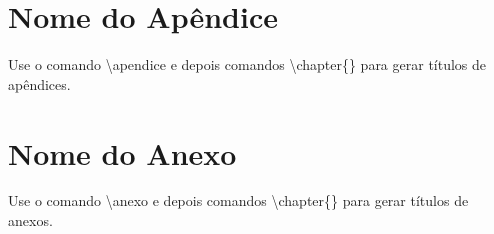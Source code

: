 \documentclass[oneside]{normas-utf-tex} %
\begin{document}
\apendice
\chapter{Nome do Apêndice}

Use o comando {\ttfamily \textbackslash apendice} e depois comandos {\ttfamily \textbackslash chapter\{\}}
para gerar títulos de apêndices.


\anexo
\chapter{Nome do Anexo}

Use o comando {\ttfamily \textbackslash anexo} e depois comandos {\ttfamily \textbackslash chapter\{\}}
para gerar títulos de anexos.








% 
%
\end{document}
